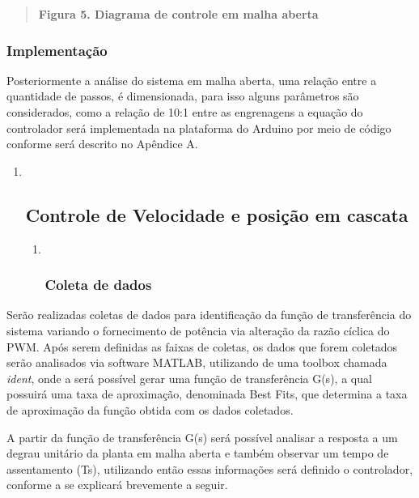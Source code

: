 \documentclass[]{article}
\begin{document}
\begin{quote}
\textbf{Figura 5. Diagrama de controle em malha aberta}
\end{quote}

\subsubsection{Implementação}\label{implementauxe7uxe3o}

Posteriormente a análise do sistema em malha aberta, uma relação entre a
quantidade de passos, é dimensionada, para isso alguns parâmetros são
considerados, como a relação de 10:1 entre as engrenagens a equação do
controlador será implementada na plataforma do Arduino por meio de
código conforme será descrito no Apêndice A.

\begin{enumerate}
\def\labelenumi{\arabic{enumi}.}
\item ~
  \subsection{Controle de Velocidade e posição em
  cascata}\label{controle-de-velocidade-e-posiuxe7uxe3o-em-cascata}

  \begin{enumerate}
  \def\labelenumii{\arabic{enumii}.}
  \item ~
    \subsubsection{Coleta de dados}\label{coleta-de-dados-1}
  \end{enumerate}
\end{enumerate}

Serão realizadas coletas de dados para identificação da função de
transferência do sistema variando o fornecimento de potência via
alteração da razão cíclica do PWM. Após serem definidas as faixas de
coletas, os dados que forem coletados serão analisados via software
MATLAB, utilizando de uma toolbox chamada \emph{ident}, onde a será
possível gerar uma função de transferência G(s), a qual possuirá uma
taxa de aproximação, denominada Best Fits, que determina a taxa de
aproximação da função obtida com os dados coletados.

A partir da função de transferência G(s) será possível analisar a
resposta a um degrau unitário da planta em malha aberta e também
observar um tempo de assentamento (Ts), utilizando então essas
informações será definido o controlador, conforme a se explicará
brevemente a seguir.
\end{document}
